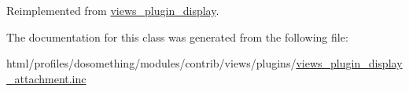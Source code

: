 Reimplemented from \hyperlink{classviews__plugin__display_a5bfcb22187618f52bea9ea626aff18a4}{views\_\-plugin\_\-display}.

The documentation for this class was generated from the following file:\begin{DoxyCompactItemize}
\item 
html/profiles/dosomething/modules/contrib/views/plugins/\hyperlink{views__plugin__display__attachment_8inc}{views\_\-plugin\_\-display\_\-attachment.inc}\end{DoxyCompactItemize}
